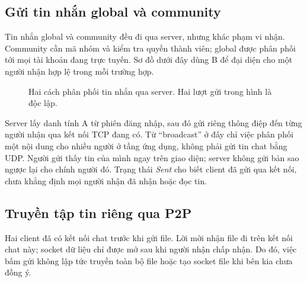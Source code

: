 \clearpage
\subsection{Gửi tin nhắn global và community}

Tin nhắn global và community đều đi qua server, nhưng khác phạm vi nhận.
Community cần mã nhóm và kiểm tra quyền thành viên; global được phân phối tới
mọi tài khoản đang trực tuyến. Sơ đồ dưới đây dùng B để đại diện cho một người
nhận hợp lệ trong mỗi trường hợp.

\begin{figure}[H]
\centering
{}
\caption{Hai cách phân phối tin nhắn qua server. Hai lượt gửi trong hình là độc lập.}
\label{fig:seq-broadcast}
\end{figure}

Server lấy danh tính A từ phiên đăng nhập, sau đó gửi riêng thông điệp đến từng
người nhận qua kết nối TCP đang có. Từ ``broadcast'' ở đây chỉ việc phân phối
một nội dung cho nhiều người ở tầng ứng dụng, không phải gửi tin chat bằng UDP.
Người gửi thấy tin của mình ngay trên giao diện; server không gửi bản sao ngược
lại cho chính người đó. Trạng thái \textit{Sent} cho biết client đã gửi qua kết
nối, chưa khẳng định mọi người nhận đã nhận hoặc đọc tin.

\clearpage
\subsection{Truyền tập tin riêng qua P2P}

Hai client đã có kết nối chat trước khi gửi file. Lời mời nhận file đi trên kết
nối chat này; socket dữ liệu chỉ được mở sau khi người nhận chấp nhận. Do đó,
việc bấm gửi không lập tức truyền toàn bộ file hoặc tạo socket file khi bên kia
chưa đồng ý.

